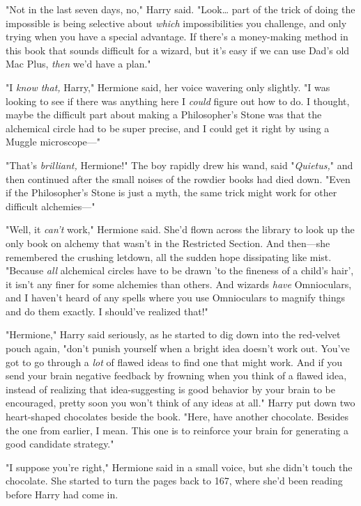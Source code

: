 "Not in the last seven days, no," Harry said. "Look{\ldots} part of the trick 
of doing the impossible is being selective about \emph{which} impossibilities 
you challenge, and only trying when you have a special advantage. If there's a 
money-making method in this book that sounds difficult for a wizard, but it's 
easy if we can use Dad's old Mac Plus, \emph{then} we'd have a plan."

"I \emph{know that,} Harry," Hermione said, her voice wavering only slightly. 
"I was looking to see if there was anything here I \emph{could} figure out how 
to do. I thought, maybe the difficult part about making a Philosopher's Stone 
was that the alchemical circle had to be super precise, and I could get it 
right by using a Muggle microscope---"

"That's \emph{brilliant,} Hermione!" The boy rapidly drew his wand, said 
"\emph{Quietus,}" and then continued after the small noises of the rowdier 
books had died down. "Even if the Philosopher's Stone is just a myth, the same 
trick might work for other difficult alchemies---"

"Well, it \emph{can't} work," Hermione said. She'd flown across the library to 
look up the only book on alchemy that wasn't in the Restricted Section. And 
then---she remembered the crushing letdown, all the sudden hope dissipating 
like mist. "Because \emph{all} alchemical circles have to be drawn 'to the 
fineness of a child's hair', it isn't any finer for some alchemies than others. 
And wizards \emph{have} Omnioculars, and I haven't heard of any spells where 
you use Omnioculars to magnify things and do them exactly. I should've realized 
that!"

"Hermione," Harry said seriously, as he started to dig down into the red-velvet 
pouch again, "don't punish yourself when a bright idea doesn't work out. You've 
got to go through a \emph{lot} of flawed ideas to find one that might work. And 
if you send your brain negative feedback by frowning when you think of a flawed 
idea, instead of realizing that idea-suggesting is good behavior by your brain 
to be encouraged, pretty soon you won't think of any ideas at all." Harry put 
down two heart-shaped chocolates beside the book. "Here, have another 
chocolate. Besides the one from earlier, I mean. This one is to reinforce your 
brain for generating a good candidate strategy."

"I suppose you're right," Hermione said in a small voice, but she didn't touch 
the chocolate. She started to turn the pages back to 167, where she'd been 
reading before Harry had come in.

